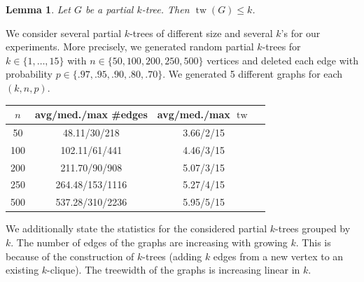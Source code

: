 \documentclass[11pt,a4paper]{article}
\newtheorem*{lemma}{Lemma}
\DeclareMathOperator{\tw}{tw}
\begin{document}
\begin{lemma}
Let $G$ be a partial $k$-tree. Then $\tw(G) \leq k$.
\end{lemma}

We consider several partial $k$-trees of different size and several $k$'s for our experiments. More precisely, we generated random partial $k$-trees for $k \in \{1, \dots, 15\}$ with $n \in \{50,100,200,250,500\}$ vertices and deleted each edge with probability $p \in \{.97, .95, .90, .80, .70\}$. We generated 5 different graphs for each $(k, n, p)$.

\begin{center}
\begin{table}[h!]
\centering
\begin{tabular}{|c|c|c|c|}
\hline
$n$ & avg/med./max \#edges & avg/med./max $\tw$ \\
\hline \hline
50 & 48.11/30/218 & 3.66/2/15 \\
\hline
100 & 102.11/61/441 & 4.46/3/15 \\
\hline
200 & 211.70/90/908 & 5.07/3/15 \\
\hline
250 & 264.48/153/1116 & 5.27/4/15 \\
\hline
500 & 537.28/310/2236 & 5.95/5/15 \\
\hline
\end{tabular}
\end{table}
\end{center}

We additionally state the statistics for the considered partial $k$-trees grouped by $k$. The number of edges of the graphs are increasing with growing $k$. This is because of the construction of $k$-trees (adding $k$ edges from a new vertex to an existing $k$-clique). The treewidth of the graphs is increasing linear in $k$.
\end{document}
